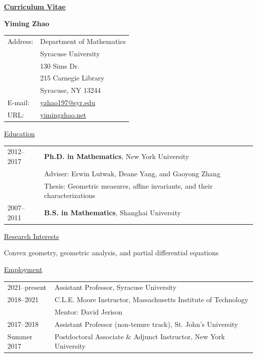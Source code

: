 \documentclass[12pt]{article}
\theoremstyle{plain} \numberwithin{equation}{section}
\theoremstyle{definition}
\newcommand{\cvsection}[1]{%
  \Needspace{6\baselineskip}%
  \par\addvspace{0.8\baselineskip}%
  \noindent\underline{#1}\par\nobreak
  \vspace{0.3\baselineskip}%
}
\begin{document}
\begin{center}
{\large\bfseries\underline{Curriculum Vitae}}
\end{center}
\vspace{-0.45\baselineskip}

{\large\bfseries Yiming Zhao}

\begin{tabular}{@{}p{0.85in}l@{}}

Address: & Department of Mathematics\\
  & Syracuse University\\
  & 130 Sims Dr.\\
  & 215 Carnegie Library \\
  & Syracuse, NY 13244\\
E-mail: & \href{mailto:yzhao197@syr.edu}{yzhao197@syr.edu}\\
URL: & \href{https://www.yimingzhao.net}{yimingzhao.net}\\

\end{tabular}

\cvsection{Education}

\begin{tabular}{@{}p{0.95in}l@{}}
2012--2017 & \textbf{Ph.D. in Mathematics}, New York University\\
& Adviser: Erwin Lutwak, Deane Yang, and Gaoyong Zhang\\
& Thesis: Geometric measures, affine invariants, and their characterizations\\
2007--2011 & \textbf{B.S. in Mathematics}, Shanghai University\\
\end{tabular}


\cvsection{Research Interests}
Convex geometry, geometric analysis, and partial differential equations

\cvsection{Employment}

\begin{tabular}{@{}p{1.08in}l@{}}
2021--present & Assistant Professor, Syracuse University\\
2018--2021 & C.L.E. Moore Instructor, Massachusetts Institute of Technology\\
& Mentor: David Jerison\\
2017--2018 & Assistant Professor (non-tenure track), St. John's University\\
Summer 2017 & Postdoctoral Associate \& Adjunct Instructor, New York University\\
\end{tabular}
\end{document}
